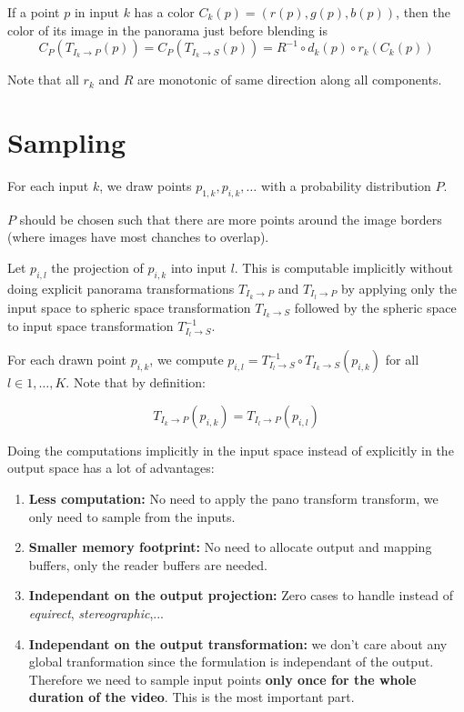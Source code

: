 \documentclass{article}
\begin{document}
If a point $p$ in input $k$ has a color $C_k(p) = (r(p), g(p), b(p))$, then the color of its image in the panorama just before blending
is
\begin{equation}
 C_P(T_{I_k \rightarrow P}(p)) = C_P(T_{I_k \rightarrow S}(p)) = R^{-1} \circ d_k(p) \circ r_k (C_k(p))
\end{equation}
 
Note that all $r_k$ and $R$ are monotonic of same direction along all components.

\section{Sampling}

For each input $k$, we draw points $p_{1,k}, p_{i,k}, \dots$ with a probability distribution $P$. 

$P$ should be chosen such that there are more points around the image borders (where images have most chanches to overlap).

Let $p_{i,l}$ the projection of $p_{i,k}$ into input $l$. This is computable implicitly without doing explicit panorama
transformations $T_{I_k \rightarrow P}$ and $T_{I_l \rightarrow P}$ by applying only the input
space to spheric space transformation $T_{I_k \rightarrow S}$ followed by the spheric space to input space transformation $T^{-1}_{I_l \rightarrow S}$.

For each drawn point $p_{i,k}$, we compute $p_{i,l} = T^{-1}_{I_l \rightarrow S} \circ T_{I_k \rightarrow S} (p_{i,k})$ for all $l \in {1,\dots,K}$.
Note that by definition:

\begin{equation}
  T_{I_k \rightarrow P}(p_{i,k}) = T_{I_l \rightarrow P}(p_{i,l})
\end{equation}

Doing the computations implicitly in the input space instead of explicitly in the output space has a lot of advantages:

\begin{enumerate}
  \item {\bf Less computation:} No need to apply the pano transform transform, we only need to sample from the inputs.
  \item {\bf Smaller memory footprint:} No need to allocate output and mapping buffers, only the reader buffers are needed.
  \item {\bf Independant on the output projection:} Zero cases to handle instead of {\em equirect}, {\em stereographic},...
  \item {\bf Independant on the output transformation:} we don't care about any global tranformation since the formulation is independant of the output. Therefore we need to sample input points {\bf only once for the whole duration of the video}. This is the most important part.
\end{enumerate}
\end{document}
